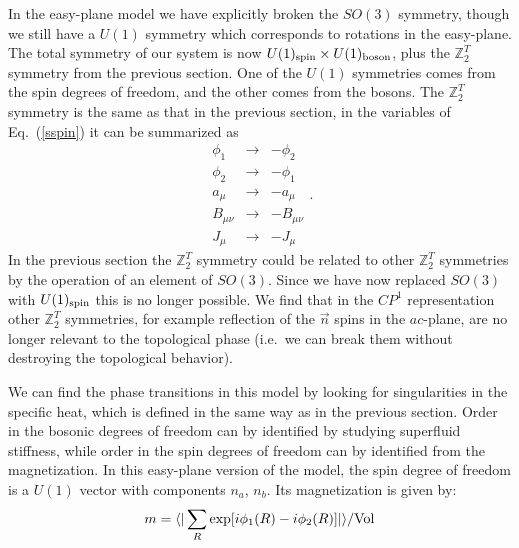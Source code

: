 \documentclass[prb,twocolumn]{revtex4-1}
\def\ztwot{\mathbb{Z}_2^T}
\newcommand{\cp}{$CP^1$ }
\begin{document}
In the easy-plane model we have explicitly broken the $SO(3)$ symmetry, though we still have a $U(1)$ symmetry which corresponds to rotations in the easy-plane. The total symmetry of our system is now $U(1)_{\rm spin}\times U(1)_{\rm boson}$, plus the $\ztwot$ symmetry from the previous section. One of the $U(1)$ symmetries comes from the spin degrees of freedom, and the other comes from the bosons. The $\ztwot$ symmetry is the same as that in the previous section, 
 in the variables of Eq.~(\ref{sspin}) it can be summarized as
\begin{equation}
\begin{array}{ccc}
 \phi_1&\rightarrow& -\phi_2 \\
\phi_2&\rightarrow &-\phi_1 \\
a_\mu&\rightarrow & -a_\mu \\
B_{\mu\nu}&\rightarrow & -B_{\mu\nu}\\
J_\mu &\rightarrow &-J_\mu 
\end{array}.
\label{z2}
\end{equation}
In the previous section the $\ztwot$ symmetry could be related to other $\ztwot$ symmetries by the operation of an element of $SO(3)$. Since we have now replaced $SO(3)$ with $U(1)_{\rm spin}$ this is no longer possible. We find that in the \cp representation other $\ztwot$ symmetries, for example reflection of the $\vec n$ spins in the $ac$-plane, are no longer relevant to the topological phase (i.e.~we can break them without destroying the topological behavior).

We can find the phase transitions in this model by looking for singularities in the specific heat, which is defined in the same way as in the previous section. Order in the bosonic degrees of freedom can by identified by studying superfluid stiffness, while order in the spin degrees of freedom can by identified from the magnetization. In this easy-plane  version of the model, the spin degree of freedom is a $U(1)$ vector with components $n_a$, $n_b$. 
Its magnetization is given by:
\begin{equation}
m=\langle|\sum_R \exp[i\phi_1(R)-i\phi_2(R)]|\rangle /{\rm Vol} 
\end{equation}
\end{document}
